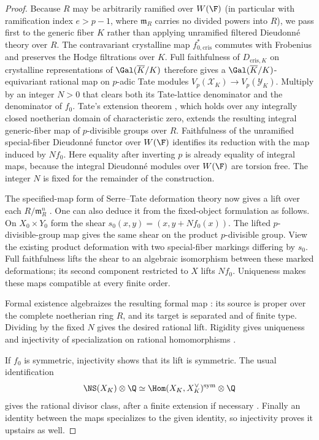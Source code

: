 \begin{proof}
Because \(R\) may be arbitrarily ramified over \(W(\F)\) (in particular
with ramification index \(e>p-1\), where \(\mathfrak m_R\) carries no
divided powers into \(R\)), we pass first to the generic fiber \(K\)
rather than applying unramified filtered Dieudonn\'e theory over \(R\).
The contravariant crystalline map \(f_{0,\mathrm{cris}}^*\) commutes with
Frobenius and preserves the Hodge filtrations over \(K\). Full faithfulness
of \(D_{\mathrm{cris},K}\) on crystalline representations of
\(\Gal(\overline K/K)\) \cite[Theorem~A]{ColmezFontaine2000} therefore
gives a \(\Gal(\overline K/K)\)-equivariant rational map on \(p\)-adic Tate
modules \(V_p(\mathcal X_K)\to V_p(\mathcal Y_K)\). Multiply by an integer
\(N>0\) that clears both its Tate-lattice denominator and the denominator of
\(f_0\). Tate's extension theorem
\cite[Theorem~4]{Tate1967}, which holds over any integrally closed
noetherian domain of characteristic zero, extends the resulting integral
generic-fiber map of \(p\)-divisible groups over \(R\). Faithfulness of the
unramified special-fiber Dieudonn\'e functor over \(W(\F)\) identifies its
reduction with the map induced by \(Nf_0\). Here equality after inverting
\(p\) is already equality of integral maps, because the integral Dieudonn\'e
modules over \(W(\F)\) are torsion free. The integer \(N\) is fixed for the
remainder of the construction.

The specified-map form of Serre--Tate deformation theory now gives a
lift over each \(R/\mathfrak m_R^n\)
\cite[p.~432]{Grothendieck1970}. One can also deduce it from the
fixed-object formulation \cite[Theorem~2.3.3]{IllusiePisa} as follows.
On \(X_0\times Y_0\) form the shear
\(s_0(x,y)=(x,y+Nf_0(x))\). The lifted \(p\)-divisible-group map gives
the same shear on the product \(p\)-divisible group. View the existing
product deformation with two special-fiber markings differing by
\(s_0\). Full faithfulness lifts the shear to an algebraic isomorphism
between these marked deformations; its second component restricted to
\(X\) lifts \(Nf_0\). Uniqueness makes these maps compatible at every
finite order.

Formal existence algebraizes the resulting formal map
\cite[Tag~0A42]{StacksProject}: its source is proper over the complete
noetherian ring \(R\), and its target is separated and of finite type.
Dividing by the fixed \(N\) gives the desired rational lift. Rigidity
gives uniqueness and injectivity of specialization on rational
homomorphisms \cite[Proposition~20.1 and Corollary~20.2]{MilneAV}.

If \(f_0\) is symmetric, injectivity shows that its lift is symmetric.
The usual identification
\[
 \NS(X_K)\otimes\Q
   \simeq\Hom(X_K,X_K^\vee)^{\mathrm{sym}}\otimes\Q
\]
gives the rational divisor class, after a finite extension if
necessary \cite[Proposition~17.2]{MilneAV}. Finally an identity between the maps specializes to the
given identity, so injectivity proves it upstairs as well.
\end{proof}

